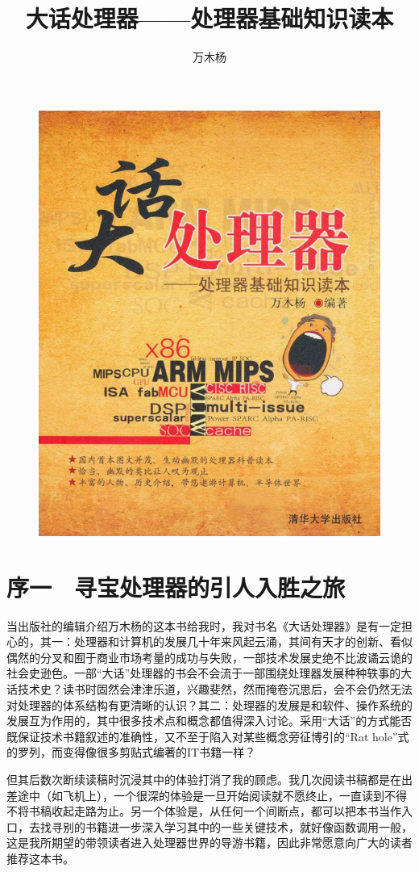 \documentclass[12pt,UTF8]{ctexbook}
\title{\heiti\zihao{0} 大话处理器——处理器基础知识读本}
\author{万木杨}
\date{}
\begin{document}
\maketitle
\tableofcontents

\frontmatter

\begin{figure}[htbp]
	\centering
	\includegraphics[width=0.7\linewidth]{cover}
	\caption{}
	\label{fig:1}
\end{figure}

\chapter{序一　寻宝处理器的引人入胜之旅}

当出版社的编辑介绍万木杨的这本书给我时，我对书名《大话处理器》是有一定担心的，其一：处理器和计算机的发展几十年来风起云涌，其间有天才的创新、看似偶然的分叉和囿于商业市场考量的成功与失败，一部技术发展史绝不比波谲云诡的社会史逊色。一部“大话”处理器的书会不会流于一部围绕处理器发展种种轶事的大话技术史？读书时固然会津津乐道，兴趣斐然，然而掩卷沉思后，会不会仍然无法对处理器的体系结构有更清晰的认识？其二：处理器的发展是和软件、操作系统的发展互为作用的，其中很多技术点和概念都值得深入讨论。采用“大话”的方式能否既保证技术书籍叙述的准确性，又不至于陷入对某些概念旁征博引的“Rat hole”式的罗列，而变得像很多剪贴式编著的IT书籍一样？

但其后数次断续读稿时沉浸其中的体验打消了我的顾虑。我几次阅读书稿都是在出差途中（如飞机上），一个很深的体验是一旦开始阅读就不愿终止，一直读到不得不将书稿收起走路为止。另一个体验是，从任何一个间断点，都可以把本书当作入口，去找寻别的书籍进一步深入学习其中的一些关键技术，就好像函数调用一般，这是我所期望的带领读者进入处理器世界的导游书籍，因此非常愿意向广大的读者推荐这本书。
\end{document}
